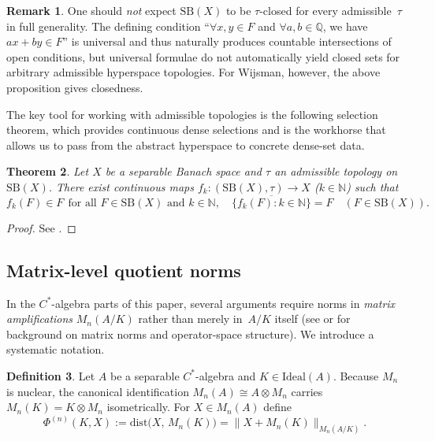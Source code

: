 \documentclass[12pt,fleqn,a4paper]{amsart}
\numberwithin{equation}{section}
\newtheorem{theorem}{Theorem}[section]
\theoremstyle{definition}
\newtheorem{definition}[theorem]{Definition}
\newtheorem{remark}[theorem]{Remark}
\newcommand{\N}{\mathbb{N}}
\newcommand{\Q}{\mathbb{Q}}
\newcommand{\SB}{\mathrm{SB}}
\newcommand{\Ideal}{\mathrm{Ideal}}
\newcommand{\dist}{\mathrm{dist}}
\begin{document}
\begin{remark}\label{rem:SBX-Gdelta}
One should \emph{not} expect $\SB(X)$ to be $\tau$-closed for every admissible~$\tau$
in full generality.  The defining condition
``$\forall x,y\in F$ and $\forall a,b\in\Q$, we have $ax+by\in F$'' is universal
and thus naturally produces countable intersections of open conditions, but universal
formulae do not automatically yield closed sets for arbitrary admissible hyperspace
topologies.  For Wijsman, however, the above proposition gives closedness.
\end{remark}

The key tool for working with admissible topologies is the following selection theorem,
which provides continuous dense selections and is the workhorse that allows us to
pass from the abstract hyperspace to concrete dense-set data.

\begin{theorem}\label{thm:GSR}
Let $X$ be a separable Banach space and $\tau$ an admissible topology on $\SB(X)$.
There exist continuous maps $f_k:(\SB(X),\tau)\to X$ ($k\in\N$) such that
\[
f_k(F)\in F\ \ \text{for all }F\in\SB(X)\text{ and }k\in\N,
\quad
\overline{\{f_k(F):k\in\N\}}=F\quad (F\in\SB(X)).
\]
\end{theorem}

\begin{proof}
See \cite{GodefroySaintRaymond2018}.
\end{proof}

\subsection{Matrix-level quotient norms}\label{subsec:matrix-Phi}

In the $C^*$-algebra parts of this paper, several arguments require norms
in \emph{matrix amplifications} $M_n(A/K)$ rather than merely in~$A/K$ itself
(see \cite[II.6.6]{BlackadarOA} or \cite[Chapter~1]{BrownOzawa} for background on
matrix norms and operator-space structure).
We introduce a systematic notation.

\begin{definition}\label{def:Phi-matrix}
Let $A$ be a separable $C^*$-algebra and $K\in\Ideal(A)$.
Because $M_n$ is nuclear, the canonical identification $M_n(A)\cong A\otimes M_n$
carries $M_n(K)=K\otimes M_n$ isometrically.  For $X\in M_n(A)$ define
\[
\Phi^{(n)}(K,X):=\dist\bigl(X,\,M_n(K)\bigr)=\|X+M_n(K)\|_{M_n(A/K)}.
\]
\end{definition}
\end{document}
